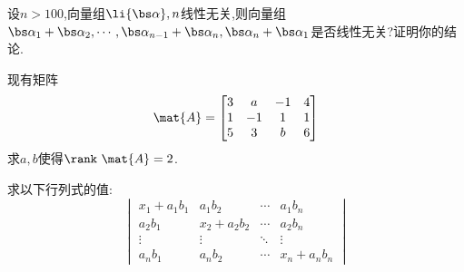\documentclass{ctexart}
\begin{document}
\begin{homework}[7]
    设$n>100$,向量组$\li{\bs\alpha},n$线性无关,则向量组$\bs\alpha_1+\bs\alpha_2,\cdots,\bs\alpha_{n-1}+\bs\alpha_n,\bs\alpha_n+\bs\alpha_1$是否线性无关?证明你的结论.
\end{homework}
\begin{homework}[8]
    现有矩阵
    \[\mat{A}=\begin{bmatrix}
        3&a&-1&4\\
        1&-1&1&1\\
        5&3&b&6
    \end{bmatrix}\]
    求$a,b$使得$\rank\ \mat{A}=2$.
\end{homework}
\begin{homework}[9]
    求以下行列式的值:
    \[\begin{vmatrix}
        x_1+a_1b_1&a_1b_2&\cdots&a_1b_n\\
        a_2b_1&x_2+a_2b_2&\cdots&a_2b_n\\
        \vdots&\vdots&\ddots&\vdots\\
        a_nb_1&a_nb_2&\cdots&x_n+a_nb_n
    \end{vmatrix}\]
\end{homework}
\end{document}
